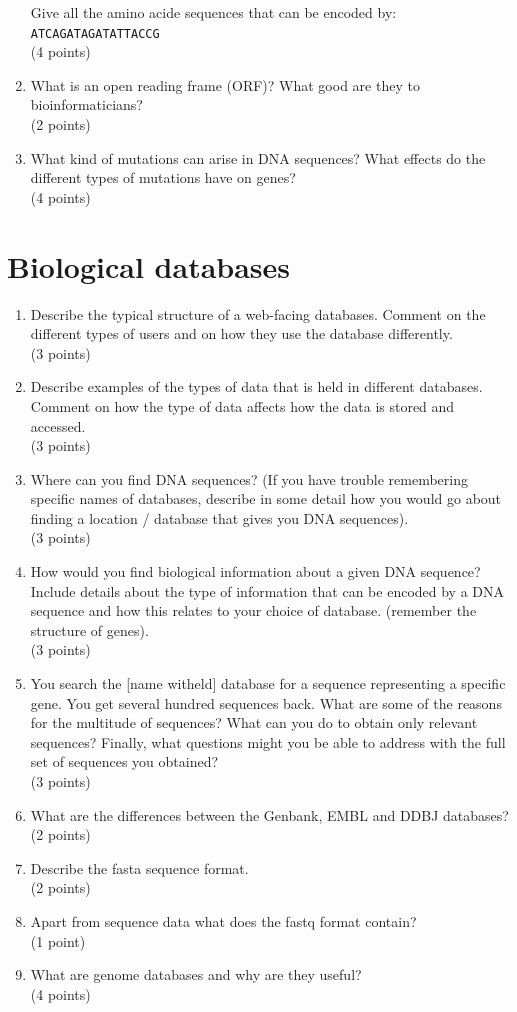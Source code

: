 \documentclass[11pt]{article}
\begin{document}
\begin{enumerate}
  Give all the amino acide sequences that can be encoded by:\\
  \verb|ATCAGATAGATATTACCG|\\
  (4 points)
\item What is an open reading frame (ORF)? What good are they to
  bioinformaticians?\\
  (2 points)
\item What kind of mutations can arise in DNA sequences? What effects
  do the different types of mutations have on genes?\\
  (4 points)
\end{enumerate}

\section{Biological databases}
\begin{enumerate}
\item Describe the typical structure of a web-facing databases. Comment on the
  different types of users and on how they use the database differently.\\
  (3 points)
\item Describe examples of the types of data that is held in different
  databases. Comment on how the type of data affects how the data is stored
  and accessed.\\
  (3 points)
\item Where can you find DNA sequences? (If you have trouble remembering
  specific names of databases, describe in some detail how you would go about finding a
  location / database that gives you DNA sequences).\\
  (3 points)
\item How would you find biological information about a given DNA sequence?
  Include details about the type of information that can be encoded by a DNA
  sequence and how this relates to your choice of database.
  (remember the structure of genes).\\
  (3 points)
\item You search the [name witheld] database for a sequence representing a
  specific gene. You get several hundred sequences back. What are some of the reasons
  for the multitude of sequences? What can you do to obtain only relevant
  sequences? Finally, what questions might you be able to address with the
  full set of sequences you obtained?\\
  (3 points)
\item What are the differences between the Genbank, EMBL and DDBJ databases?\\
  (2 points)
\item Describe the fasta sequence format.\\
  (2 points)
\item Apart from sequence data what does the fastq format contain?\\
  (1 point)
\item What are genome databases and why are they useful?\\
  (4 points)
\end{enumerate}
\end{document}
